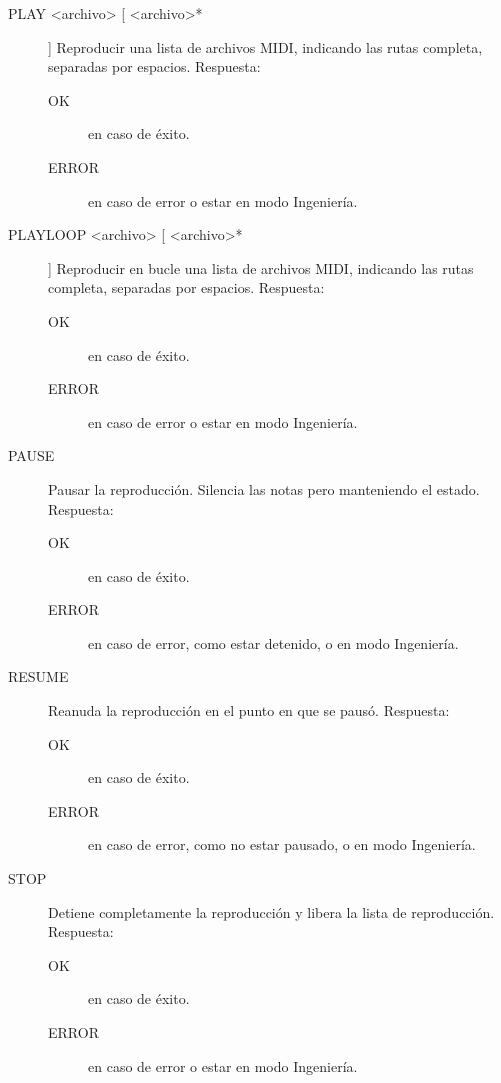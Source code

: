 \begin{description}
	\item[PLAY <archivo> [ <archivo>*]] Reproducir una lista de archivos MIDI, indicando las rutas completa, separadas por espacios. Respuesta:
	
	\begin{description}
		\item[OK] en caso de éxito.
		\item[ERROR] en caso de error o estar en modo Ingeniería.
	\end{description}
	
	\item[PLAYLOOP <archivo> [ <archivo>* ]] Reproducir en bucle una lista de archivos MIDI, indicando las rutas completa, separadas por espacios. Respuesta:
	
	\begin{description}
		\item[OK] en caso de éxito.
		\item[ERROR] en caso de error o estar en modo Ingeniería.
	\end{description}
	
	\item[PAUSE] Pausar la reproducción. Silencia las notas pero manteniendo el estado. Respuesta:
	
	\begin{description}
		\item[OK] en caso de éxito.
		\item[ERROR] en caso de error, como estar detenido, o en modo Ingeniería.
	\end{description}
	
	\item[RESUME] Reanuda la reproducción en el punto en que se pausó. Respuesta:
	
	\begin{description}
		\item[OK] en caso de éxito.
		\item[ERROR] en caso de error, como no estar pausado, o en modo Ingeniería.
	\end{description}
	
	\item[STOP] Detiene completamente la reproducción y libera la lista de reproducción. Respuesta:
	
	\begin{description}
		\item[OK] en caso de éxito.
		\item[ERROR] en caso de error o estar en modo Ingeniería.
	\end{description}
	

\end{description}

